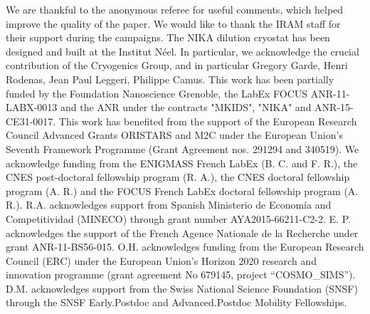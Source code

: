 \documentclass[traditabstract]{aa}
\begin{document}
\begin{acknowledgements}
We are thankful to the anonymous referee for useful comments, which helped improve the quality of the paper.
We would like to thank the IRAM staff for their support during the campaigns. 
The NIKA dilution cryostat has been designed and built at the Institut N\'eel. In particular, we acknowledge the crucial contribution of the Cryogenics Group, and  in particular Gregory Garde, Henri Rodenas, Jean Paul Leggeri, Philippe Camus. 
This work has been partially funded by the Foundation Nanoscience Grenoble, the LabEx FOCUS ANR-11-LABX-0013 and the ANR under the contracts "MKIDS", "NIKA" and ANR-15-CE31-0017. 
This work has benefited from the support of the European Research Council Advanced Grants ORISTARS and M2C under the European Union's Seventh Framework Programme (Grant Agreement nos. 291294 and 340519).
We acknowledge funding from the ENIGMASS French LabEx (B. C. and F. R.), the CNES post-doctoral fellowship program (R. A.),  the CNES doctoral fellowship program (A. R.) and the FOCUS French LabEx doctoral fellowship program (A. R.).
R.A. acknowledges support from Spanish Ministerio de Econom\'ia and Competitividad (MINECO) through grant number AYA2015-66211-C2-2.
E. P. acknowledges the support of the French Agence Nationale de la Recherche under grant ANR-11-BS56-015.
O.H. acknowledges funding from the European Research Council (ERC) under the European Union's Horizon 2020 research and innovation programme (grant agreement No 679145, project “COSMO\_SIMS”).
D.M. acknowledges support from the Swiss National Science Foundation (SNSF) through the SNSF Early.Postdoc and Advanced.Postdoc Mobility Fellowships. 
\end{acknowledgements}



\appendix
\end{document}
